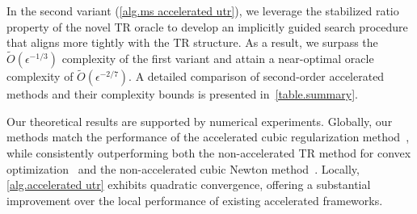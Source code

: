 \documentclass{article}
\begin{document}
In the second variant (\autoref{alg.ms accelerated utr}), we leverage the stabilized ratio property of the novel TR oracle to develop an implicitly guided search procedure that aligns more tightly with the TR structure. As a result, we surpass the $\tilde{O}(\epsilon^{-1/3})$ complexity of the first variant and attain a near-optimal oracle complexity of $\tilde{O}(\epsilon^{-2/7})$. A detailed comparison of second-order accelerated methods and their complexity bounds is presented in~\autoref{table.summary}.

Our theoretical results are supported by numerical experiments. Globally, our methods match the performance of the accelerated cubic regularization method~\cite{nesterov2008accelerating}, while consistently outperforming both the non-accelerated TR method for convex optimization~\cite{jiang2024nonconvexityuniversaltrustregionmethod} and the non-accelerated cubic Newton method~\cite{nesterov2006cubic}. Locally, \autoref{alg.accelerated utr} exhibits quadratic convergence, offering a substantial improvement over the local performance of existing accelerated frameworks.
\end{document}
